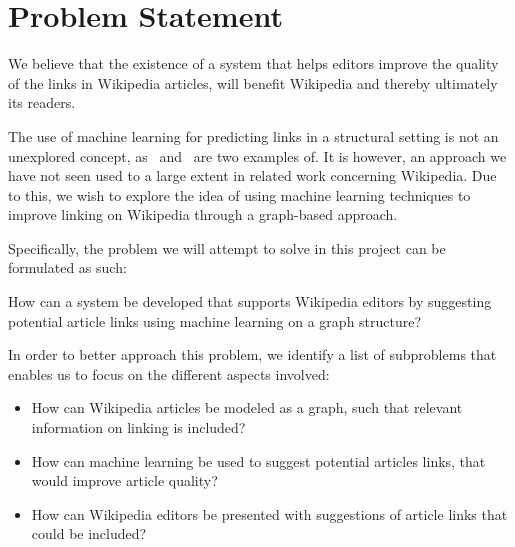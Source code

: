 \section{Problem Statement}\label{sec:problem_statement}
We believe that the existence of a system that helps editors improve the quality of the links in Wikipedia articles, will benefit Wikipedia and thereby ultimately its readers.

The use of machine learning for predicting links in a structural setting is not an unexplored concept, as~\cite{tang2015line} and~\cite{al2006link} are two examples of. It is however, an approach we have not seen used to a large extent in related work concerning Wikipedia. Due to this, we wish to explore the idea of using machine learning techniques to improve linking on Wikipedia through a graph-based approach.

Specifically, the problem we will attempt to solve in this project can be formulated as such:

\begin{formal}
How can a system be developed that supports Wikipedia editors by suggesting potential article links using machine learning on a graph structure?
\end{formal}

In order to better approach this problem, we identify a list of subproblems that enables us to focus on the different aspects involved:

\begin{itemize}
  \item How can Wikipedia articles be modeled as a graph, such that relevant information on linking is included?
  \item How can machine learning be used to suggest potential articles links, that would improve article quality?
  \item How can Wikipedia editors be presented with suggestions of article links that could be included?
\end{itemize}


